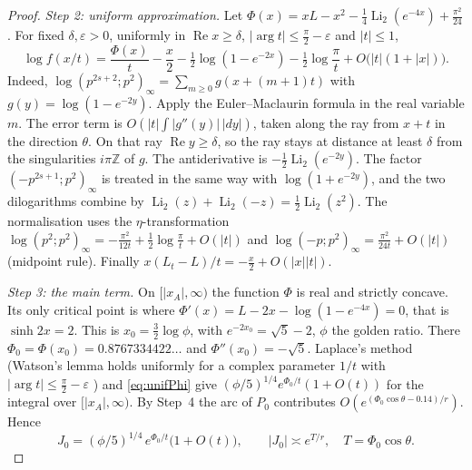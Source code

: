 \documentclass[11pt]{article}
\theoremstyle{plain}
\theoremstyle{definition}
\theoremstyle{remark}
\newcommand{\Z}{\mathbb{Z}}
\renewcommand{\Re}{\operatorname{Re}}
\theoremstyle{plain}\newtheorem*{maintheorem}{Main Theorem}
\begin{document}
\begin{proof}
\emph{Step 2: uniform approximation.} Let
$\Phi(x)=xL-x^2-\tfrac14\operatorname{Li}_2(e^{-4x})+\tfrac{\pi^2}{24}$. For fixed
$\delta,\varepsilon>0$, uniformly in $\Re x\ge\delta$, $|\arg t|\le\frac\pi2-\varepsilon$ and $|t|\le1$,
\begin{equation}\label{eq:unifPhi}
   \log f(x/t)=\frac{\Phi(x)}t-\frac x2-\tfrac12\log(1-e^{-2x})-\tfrac12\log\frac\pi t
   +O\bigl(|t|(1+|x|)\bigr).
\end{equation}
Indeed, $\log(p^{2s+2};p^2)_\infty=\sum_{m\ge0}g(x+(m+1)t)$ with $g(y)=\log(1-e^{-2y})$. Apply the
Euler--Maclaurin formula in the real variable $m$. The error term is
$O(|t|\int|g''(y)|\,|dy|)$, taken along the ray from $x+t$ in the direction $\theta$. On that ray
$\Re y\ge\delta$, so the ray stays at distance at least $\delta$ from the singularities $i\pi\Z$
of $g$. The antiderivative is $-\frac12\operatorname{Li}_2(e^{-2y})$. The factor
$(-p^{2s+1};p^2)_\infty$ is treated in the same way with $\log(1+e^{-2y})$, and the two
dilogarithms combine by $\operatorname{Li}_2(z)+\operatorname{Li}_2(-z)=\frac12\operatorname{Li}_2(z^2)$.
The normalisation uses the $\eta$-transformation
$\log(p^2;p^2)_\infty=-\frac{\pi^2}{12t}+\frac12\log\frac\pi t+O(|t|)$ and
$\log(-p;p^2)_\infty=\frac{\pi^2}{24t}+O(|t|)$ (midpoint rule). Finally
$x(L_t-L)/t=-\frac x2+O(|x||t|)$.

\emph{Step 3: the main term.} On $[|x_A|,\infty)$ the function $\Phi$ is real and strictly
concave. Its only critical point is where $\Phi'(x)=L-2x-\log(1-e^{-4x})=0$, that is
$\sinh2x=2$. This is $x_0=\frac32\log\phi$, with $e^{-2x_0}=\sqrt5-2$, $\phi$ the golden ratio.
There $\Phi_0=\Phi(x_0)=0.8767334422\ldots$ and $\Phi''(x_0)=-\sqrt5$. Laplace's method (Watson's
lemma holds uniformly for a complex parameter $1/t$ with $|\arg t|\le\frac\pi2-\varepsilon$
\cite{Olver1974}) and \eqref{eq:unifPhi} give $(\phi/5)^{1/4}e^{\Phi_0/t}(1+O(t))$ for the
integral over $[|x_A|,\infty)$. By Step~4 the arc of $P_0$ contributes
$O(e^{(\Phi_0\cos\theta-0.14)/r})$. Hence
\[
   J_0=(\phi/5)^{1/4}\,e^{\Phi_0/t}\bigl(1+O(t)\bigr),\qquad |J_0|\asymp e^{T/r},\quad
   T=\Phi_0\cos\theta .
\]


\end{proof}
\end{document}
